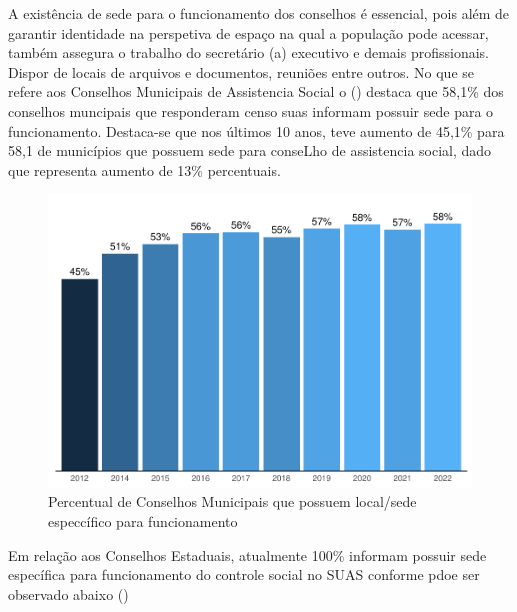 \documentclass[
  brazilian]{report}
\begin{document}
A existência de sede para o funcionamento dos conselhos é essencial,
pois além de garantir identidade na perspetiva de espaço na qual a
população pode acessar, também assegura o trabalho do secretário (a)
executivo e demais profissionais. Dispor de locais de arquivos e
documentos, reuniões entre outros. No que se refere aos Conselhos
Municipais de Assistencia Social o () destaca que
58,1\% dos conselhos muncipais que responderam censo suas informam
possuir sede para o funcionamento. Destaca-se que nos últimos 10 anos,
teve aumento de 45,1\% para 58,1 de municípios que possuem sede para
conseLho de assistencia social, dado que representa aumento de 13\%
percentuais.

\begin{figure}
\includegraphics{Censo-SUAS-2022_files/figure-latex/cmas_sede-1} \caption[Percentual de Conselhos Municipais que possuem local/sede especcífico para funcionamento]{Percentual de Conselhos Municipais que possuem local/sede especcífico para funcionamento}\label{fig:cmas_sede}
\end{figure}

Em relação aos Conselhos Estaduais, atualmente 100\% informam possuir
sede específica para funcionamento do controle social no SUAS conforme
pdoe ser observado abaixo ()
\end{document}
